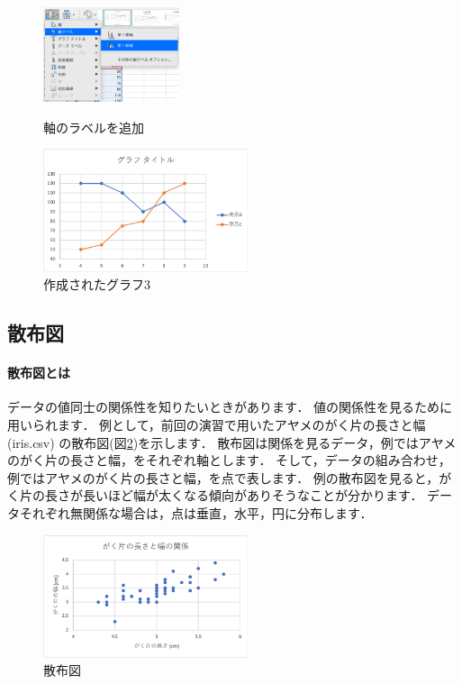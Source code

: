 \begin{figure}[tb]
    \begin{minipage}{0.5\hsize}
        \centering
        \includegraphics[width=4cm]{chap2/line_label.png}
        \caption{軸のラベルを追加}
        \label{fig:line_range}
    \end{minipage}
    \begin{minipage}{0.5\hsize}
        \centering
        \includegraphics[width=6cm]{chap2/line3.png}
        \caption{作成されたグラフ3}
        \label{fig:line3}
    \end{minipage}
\end{figure}

\subsection{散布図}

\paragraph{散布図とは}

データの値同士の関係性を知りたいときがあります．
値の関係性を見るために用いられます．
例として，前回の演習で用いたアヤメのがく片の長さと幅 (iris.csv) の散布図(図\ref{fig:scatter})を示します．
散布図は関係を見るデータ，例ではアヤメのがく片の長さと幅，をそれぞれ軸とします．
そして，データの組み合わせ，例ではアヤメのがく片の長さと幅，を点で表します．
例の散布図を見ると，がく片の長さが長いほど幅が太くなる傾向がありそうなことが分かります．
データそれぞれ無関係な場合は，点は垂直，水平，円に分布します．

\begin{figure}[htbp]
    \centering
    \includegraphics[width=6cm]{chap2/scatter.png}
    \caption{散布図}
    \label{fig:scatter}
\end{figure}


